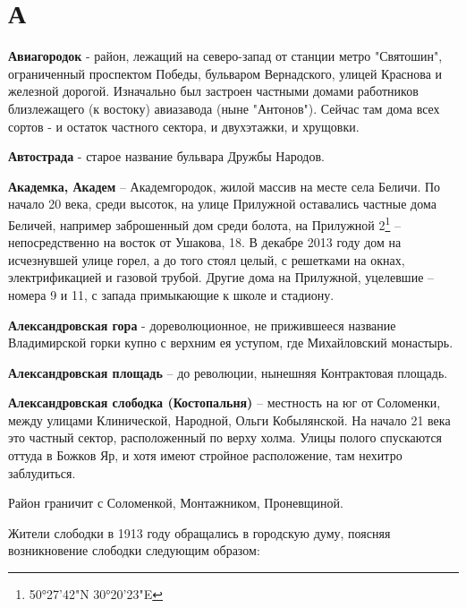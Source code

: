 \chapter*{А}


\textbf{Авиагородок} - район, лежащий на северо-запад от станции метро "Святошин", ограниченный проспектом Победы, бульваром Вернадского, улицей Краснова и железной дорогой. Изначально был застроен частными домами работников близлежащего (к востоку) авиазавода (ныне "Антонов"). Сейчас там дома всех сортов - и остаток частного сектора, и двухэтажки, и хрущовки.\\

\medskip

\textbf{Автострада} - старое название бульвара Дружбы Народов.\\

\medskip

\textbf{Академка, Академ} – Академгородок, жилой массив на месте села Беличи. По начало 20 века, среди высоток, на улице Прилужной оставались частные дома Беличей, например заброшенный дом среди болота, на Прилужной 2\footnote{50°27'42"N 30°20'23"E} – непосредственно на восток от Ушакова, 18. В декабре 2013 году дом на исчезнувшей улице горел, а до того стоял целый, с решетками на окнах, электрификацией и газовой трубой. Другие дома на Прилужной, уцелевшие – номера 9 и 11, с запада примыкающие к школе и стадиону.\\

\medskip

\textbf{Александровская гора} - дореволюционное, не прижившееся название Владимирской горки купно с верхним ея уступом, где Михайловский монастырь.\\

\medskip

\textbf{Александровская площадь} – до революции, нынешняя Контрактовая площадь.\\ 

\medskip

\textbf{Александровская слободка (Костопальня)} – местность  на юг от Соломенки, между улицами Клинической, Народной, Ольги Кобылянской. На начало 21 века это частный сектор, расположенный по верху холма. Улицы полого спускаются оттуда в Божков Яр, и хотя имеют стройное расположение, там нехитро заблудиться.

Район граничит с Соломенкой, Монтажником, Проневщиной.

Жители слободки в 1913 году обращались в городскую думу, поясняя возникновение слободки следующим образом:

